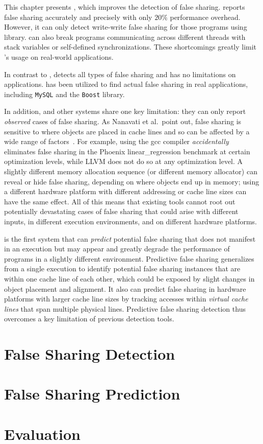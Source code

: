 \label{chapter:preditor}

This chapter presents \Predator{}, which improves the detection of false sharing. \SheriffDetect{} reports false sharing accurately and precisely with only $20\%$ performance overhead. However, it can only detect write-write false sharing for those programs using \pthreads{} library. \Sheriff{} can also break programs communicating across different threads with stack variables or self-defined synchronizations. These shortcomings greatly limit \Sheriff{}'s usage on real-world applications.  

In contrast to \SheriffDetect{}, \Predator{} detects all types of false sharing and has no limitations on applications. \Predator{} has been utilized to find actual false sharing in real applications, including \texttt{MySQL} and the \texttt{Boost} library.

In addition, \SheriffDetect{} and other systems share one key limitation: they can only report \emph{observed} cases of false sharing. As Nanavati et al.\ point out, false sharing is sensitive to where objects are placed in cache lines and so can be affected by a wide range of factors~\cite{OSdetection}. For example, using the gcc compiler \emph{accidentally} eliminates false sharing in the Phoenix linear\_regression benchmark at certain optimization levels, while LLVM does not do so at any optimization level.  A slightly different memory allocation sequence (or different memory allocator) can reveal or hide
false sharing, depending on where objects end up in memory; using a different hardware platform with different addressing or cache line sizes can have the same effect. All of this means that existing tools cannot root out potentially devastating cases of false sharing that could arise with different inputs, in different execution environments, and on different hardware platforms.

\Predator{} is the first system that can \emph{predict} potential false sharing that does not manifest in an execution but may appear and greatly degrade the performance of programs in a slightly different
environment. Predictive false sharing generalizes from a single execution to identify potential false sharing instances that are within one cache line of each other, which could be exposed by slight changes in object placement and alignment. It also can predict false sharing in hardware platforms with larger cache line sizes by tracking accesses within \emph{virtual cache lines} that span multiple physical lines. Predictive false sharing detection thus overcomes a key limitation of previous detection tools.

\section{False Sharing Detection}


\section{False Sharing Prediction}


\section{Evaluation}




